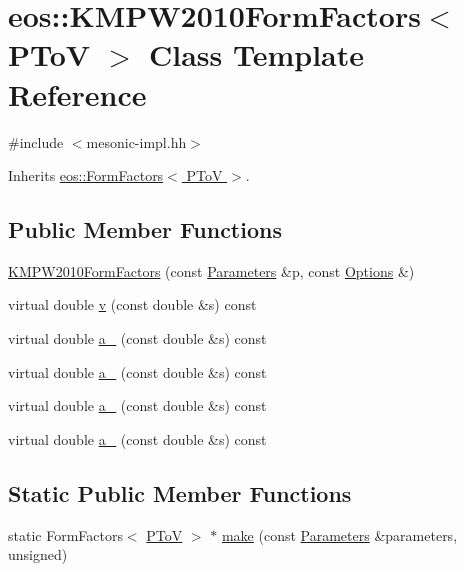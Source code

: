 \hypertarget{classeos_1_1KMPW2010FormFactors_3_01PToV_01_4}{
\section{eos::KMPW2010FormFactors$<$ PToV $>$ Class Template Reference}
\label{classeos_1_1KMPW2010FormFactors_3_01PToV_01_4}
}


{\ttfamily \#include $<$mesonic-\/impl.hh$>$}

Inherits \hyperlink{classeos_1_1FormFactors_3_01PToV_01_4}{eos::FormFactors$<$ PToV $>$}.\subsection*{Public Member Functions}
\begin{DoxyCompactItemize}
\item 
\hyperlink{classeos_1_1KMPW2010FormFactors_3_01PToV_01_4_a8aa8b61807bd884b832528421a107b75}{KMPW2010FormFactors} (const \hyperlink{classeos_1_1Parameters}{Parameters} \&p, const \hyperlink{classeos_1_1Options}{Options} \&)
\item 
virtual double \hyperlink{classeos_1_1KMPW2010FormFactors_3_01PToV_01_4_a18116140dccb14f0be2892051487e39b}{v} (const double \&s) const 
\item 
virtual double \hyperlink{classeos_1_1KMPW2010FormFactors_3_01PToV_01_4_a05b86cc4ef009a2f08fb91595ec9dd0c}{a\_} (const double \&s) const 
\item 
virtual double \hyperlink{classeos_1_1KMPW2010FormFactors_3_01PToV_01_4_a9ed6f27dc8847077c7a66d56e72ccec1}{a\_} (const double \&s) const 
\item 
virtual double \hyperlink{classeos_1_1KMPW2010FormFactors_3_01PToV_01_4_a38d93dfcb8948cf55480fb40cddbb470}{a\_} (const double \&s) const 
\item 
virtual double \hyperlink{classeos_1_1KMPW2010FormFactors_3_01PToV_01_4_ab66c9cab243661f5fbabf76b42a060d4}{a\_} (const double \&s) const 
\end{DoxyCompactItemize}
\subsection*{Static Public Member Functions}
\begin{DoxyCompactItemize}
\item 
static FormFactors$<$ \hyperlink{structeos_1_1PToV}{PToV} $>$ $\ast$ \hyperlink{classeos_1_1KMPW2010FormFactors_3_01PToV_01_4_a7b2c91918ff4cc0ed6a48ba58b24d398}{make} (const \hyperlink{classeos_1_1Parameters}{Parameters} \&parameters, unsigned)
\end{DoxyCompactItemize}
